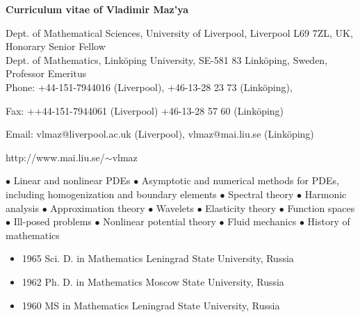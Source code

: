 \documentclass{article}
\begin{document}
\begin{center}

\textbf{\Large Curriculum vitae of
Vladimir Maz'ya}

\end{center}

\bigskip

\noindent
Dept. of Mathematical Sciences, University of Liverpool, Liverpool L69 7ZL, UK, Honorary Senior Fellow\\
Dept. of Mathematics, Link\"oping University,
SE-581 83 Link\"oping, Sweden, Professor Emeritus\\
  Phone: +44-151-7944016 (Liverpool), 
  +46-13-28 23 73 (Link\"oping), 
  
 Fax: ++44-151-7944061 (Liverpool)
 +46-13-28 57 60 (Link\"oping)
\noindent 

 Email:
        {vlmaz@liverpool.ac.uk} (Liverpool), 
        {vlmaz@mai.liu.se} (Link\"oping) 

  {http://www.mai.liu.se/$\sim$vlmaz}


\medskip


\medskip
         $\bullet$ Linear and nonlinear PDEs
      $\bullet$  Asymptotic and numerical methods
for PDEs,  including homogenization and boundary elements
       $\bullet$  Spectral theory
     $\bullet$ Harmonic analysis
 $\bullet$  Approximation theory
      $\bullet$ Wavelets
      $\bullet$  Elasticity theory
     $\bullet$  Function spaces
    $\bullet$  Ill-posed problems
       $\bullet$  Nonlinear potential theory
    $\bullet$  Fluid mechanics
      $\bullet$  History of mathematics


\medskip

\begin{itemize}
       \item 1965 Sci. D. in Mathematics
Leningrad State University, Russia
       \item 1962 Ph. D. in Mathematics Moscow
State University, Russia
       \item 1960 MS in Mathematics Leningrad
State University, Russia
\end{itemize}

\medskip
\end{document}
